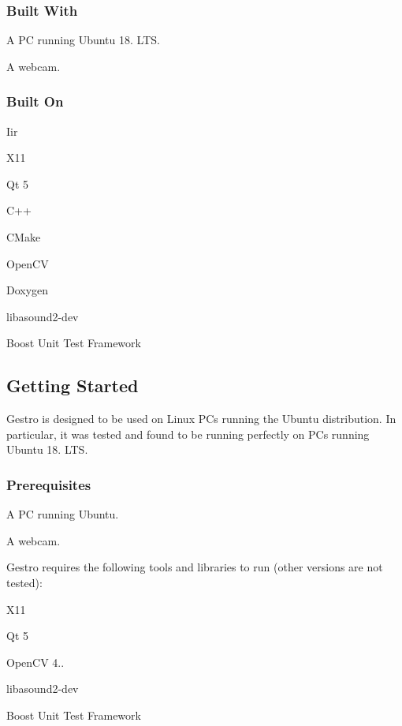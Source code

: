 \subsubsection*{Built With}


\begin{DoxyItemize}
\item A PC running Ubuntu 18. L\+TS.
\item A webcam.
\end{DoxyItemize}

\subsubsection*{Built On}


\begin{DoxyItemize}
\item Iir
\item X11
\item Qt 5
\item C++
\item C\+Make
\item Open\+CV
\item Doxygen
\item libasound2-\/dev
\item Boost Unit Test Framework
\end{DoxyItemize}

\subsection*{Getting Started}

Gestro is designed to be used on Linux P\+Cs running the Ubuntu distribution. In particular, it was tested and found to be running perfectly on P\+Cs running Ubuntu 18. L\+TS.

\subsubsection*{Prerequisites}


\begin{DoxyItemize}
\item A PC running Ubuntu.
\item A webcam.
\end{DoxyItemize}

Gestro requires the following tools and libraries to run (other versions are not tested)\+:
\begin{DoxyItemize}
\item X11
\item Qt 5
\item Open\+CV 4..
\item libasound2-\/dev
\item Boost Unit Test Framework
\end{DoxyItemize}

